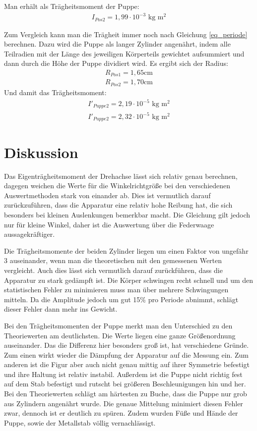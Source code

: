 Man erhält als Trägheitsmoment der Puppe:
\begin{align*}
I_{Pos 2}=1,99\cdot 10^{-3}\text{ kg m$^2$}
\end{align*}

Zum Vergleich kann man die Trägheit immer noch nach Gleichung \eqref{eq_periode} berechnen. Dazu wird die Puppe als langer Zylinder angenährt, indem alle Teilradien mit der Länge des jeweiligen Körperteils gewichtet aufsummiert und dann durch die Höhe der Puppe dividiert wird. Es ergibt sich der Radius:
\begin{align*}
R_{Pos 1}=1,65\text{cm}\\
R_{Pos 2}=1,70\text{cm}
\end{align*}
Und damit das Trägheitsmoment:
\begin{align*}
I'_{Puppe 2}=2,19\cdot10^{-5}\text{ kg m$^2$}\\
I'_{Puppe 2}=2,32\cdot10^{-5}\text{ kg m$^2$}
\end{align*}

\section{Diskussion}
Das Eigenträgheitsmoment der Drehachse lässt sich relativ genau berechnen, dagegen weichen die Werte für die Winkelrichtgröße bei den verschiedenen Auswertmethoden stark von einander ab. Dies ist vermutlich darauf zurückzuführen, dass die Apparatur eine relativ hohe Reibung hat, die sich besonders bei kleinen Auslenkungen bemerkbar macht. Die Gleichung gilt jedoch nur für kleine Winkel, daher ist die Auswertung über die Federwaage aussagekräftiger.

Die Trägheitsmomente der beiden Zylinder liegen um einen Faktor von ungefähr 3 auseinander, wenn man die theoretischen mit den gemessenen Werten vergleicht. Auch dies lässt sich vermutlich darauf zurückführen, dass die Apparatur zu stark gedämpft ist. Die Körper schwingen recht schnell und um den statistischen Fehler zu minimieren muss man über mehrere Schwingungen mitteln. Da die Amplitude jedoch um gut 15\% pro Periode abnimmt, schlägt dieser Fehler dann mehr ins Gewicht.

Bei den Trägheitsmomenten der Puppe merkt man den Unterschied zu den Theoriewerten am deutlichsten. Die Werte liegen eine ganze Größenordnung auseinander. Das die Differenz hier besonders groß ist, hat verschiedene Gründe. Zum einen wirkt wieder die Dämpfung der Apparatur auf die Messung ein. Zum anderen ist die Figur aber auch nicht genau mittig auf ihrer Symmetrie befestigt und ihre Haltung ist relativ instabil. Außerdem ist die Puppe nicht richtig fest auf dem Stab befestigt und rutscht bei größeren Beschleunigungen hin und her.
Bei den Theoriewerten schlägt am härtesten zu Buche, dass die Puppe nur grob aus Zylindern angenährt wurde. Die genaue Mittelung minimiert diesen Fehler zwar, dennoch ist er deutlich zu spüren. Zudem wurden Füße und Hände der Puppe, sowie der Metallstab völlig vernachlässigt.

